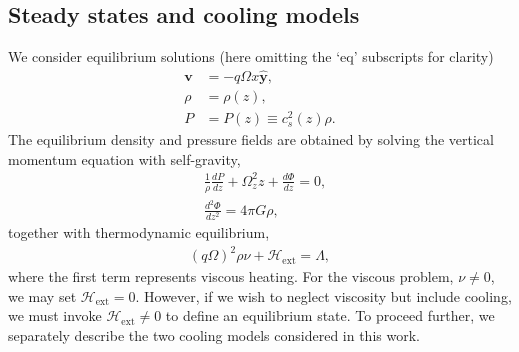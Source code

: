 \subsection{Steady states and cooling models}
We consider equilibrium solutions (here omitting the `eq' subscripts
for clarity) 
\begin{align}
  \bm{v} &= -q\Omega x \hat{\bm{y}}, \\
  \rho   &= \rho(z),\\
  P      &= P(z) \equiv c_s^2(z)\rho.
\end{align} 
The equilibrium density and pressure fields are obtained by solving
the vertical momentum equation with self-gravity,
\begin{align}
  &\frac{1}{\rho}\frac{dP}{dz} +
  \Omega_z^2z + \frac{d\Phi}{dz} = 0, \label{vert_eq1}\\
 &\frac{d^2\Phi}{dz^2} = 4 \pi G \rho,\label{vert_eq2}
\end{align}
together with thermodynamic equilibrium,
\begin{align}\label{thermal_eq}
(q\Omega)^2\rho\nu + \mathcal{H}_\mathrm{ext} = \Lambda,
\end{align}
where the first term represents viscous heating. For the viscous
problem, $\nu\neq0$, we may set $\mathcal{H}_\mathrm{ext}=0$. However,
if we wish to neglect viscosity but include cooling, we must invoke
$\mathcal{H}_\mathrm{ext}\neq0$ to define an equilibrium state.  
To proceed further, we separately describe the two cooling models
considered in this work. 


